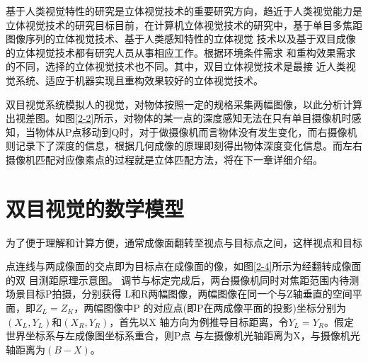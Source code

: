 
基于人类视觉特性的研究是立体视觉技术的重要研究方向，趋近于人类视觉能力是立体视觉技术的研究目标目前，在计算机立体视觉技术的研究中，基于单目多焦距图像序列的立体视觉技术、基于人类感知特性的立体视觉
技术以及基于双目成像的立体视觉技术都有研究人员从事相应工作。根据环境条件需求
和重构效果需求的不同，选择的立体视觉技术也不同。其中，双目立体视觉技术是最接
近人类视觉系统、适应于机器实现且重构效果较好的立体视觉技术。

双目视觉系统模拟人的视觉，对物体按照一定的规格采集两幅图像，以此分析计算出视差图。如图\ref{2-2}所示，对物体的某一点的深度感知无法在只有单目摄像机时感知，当物体从P点移动到Q时，对于做摄像机而言物体没有发生变化，而右摄像机则记录下了深度的信息，根据几何成像的原理即刻得出物体深度变化信息。而左右摄像机匹配对应像素点的过程就是立体匹配方法，将在下一章详细介绍。


\section{双目视觉的数学模型}

为了便于理解和计算方便，通常成像面翻转至视点与目标点之间，这样视点和目标

点连线与两成像面的交点即为目标点在成像面的像，如图\ref{2-4}所示为经翻转成像面的双
目测距原理示意图。
调节与标定完成后，两台摄像机同时对焦距范围内待测场景目标P拍摄，分别获得
L和R两幅图像，两幅图像在同一个与Z轴垂直的空间平面，即$Z_{L}=Z_{K}$，两幅图像中P
的对应点(即P在两成像平面的投影)坐标分别为$(X_{L},Y_{L})$和$(X_{R},Y_{R})$，首先以X
轴方向为例推导目标距离，令$Y_{L}=Y_{R}$。假定世界坐标系与左成像图坐标系重合，则P点
与左摄像机光轴距离为X，与摄像机光轴距离为$(B-X)$。


